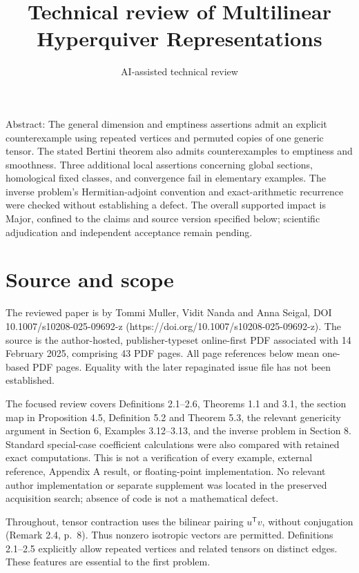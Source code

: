 \documentclass[10pt]{article}
\title{Technical review of
Multilinear Hyperquiver Representations}
\author{AI-assisted technical review}
\date{}
\begin{document}
\maketitle
Abstract: The general dimension and emptiness assertions admit an explicit counterexample using repeated vertices and permuted copies of one generic tensor. The stated Bertini theorem also admits counterexamples to emptiness and smoothness. Three additional local assertions concerning global sections, homological fixed classes, and convergence fail in elementary examples. The inverse problem’s Hermitian-adjoint convention and exact-arithmetic recurrence were checked without establishing a defect. The overall supported impact is Major, confined to the claims and source version specified below; scientific adjudication and independent acceptance remain pending.\par
\section*{Source and scope}
The reviewed paper is by Tommi Muller, Vidit Nanda and Anna Seigal, DOI 10.1007/s10208-025-09692-z (https://doi.org/10.1007/s10208-025-09692-z). The source is the author-hosted, publisher-typeset online-first PDF associated with 14 February 2025, comprising 43 PDF pages. All page references below mean one-based PDF pages. Equality with the later repaginated issue file has not been established.\par
The focused review covers Definitions 2.1–2.6, Theorems 1.1 and 3.1, the section map in Proposition 4.5, Definition 5.2 and Theorem 5.3, the relevant genericity argument in Section 6, Examples 3.12–3.13, and the inverse problem in Section 8. Standard special-case coefficient calculations were also compared with retained exact computations. This is not a verification of every example, external reference, Appendix A result, or floating-point implementation. No relevant author implementation or separate supplement was located in the preserved acquisition search; absence of code is not a mathematical defect.\par
Throughout, tensor contraction uses the bilinear pairing \(u^{\mathsf T}v\), without conjugation (Remark 2.4, p. 8). Thus nonzero isotropic vectors are permitted. Definitions 2.1–2.5 explicitly allow repeated vertices and related tensors on distinct edges. These features are essential to the first problem.\par
\end{document}
